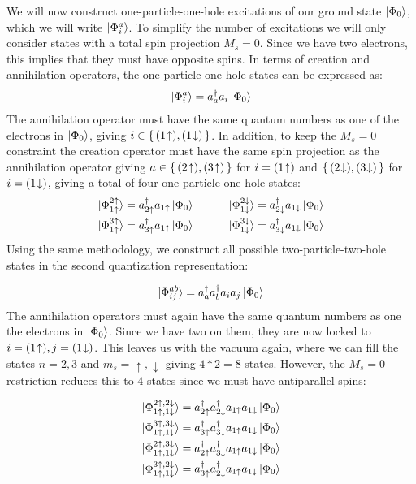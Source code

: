 \documentclass{article}
\newcommand{\gs}{\ket{\Phi_0}}
\newcommand{\exed}[2]{\ket{\Phi_{#1}^{#2}}}
\newcommand{\ups}[1]{#1\uparrow}
\newcommand{\downs}[1]{#1\downarrow}
\newcommand{\upst}[1]{#1\hspace{-2px}\uparrow}
\newcommand{\downst}[1]{#1\hspace{-2px}\downarrow}
\newcommand{\crt}[1]{a_{#1}^{\dagger}}
\newcommand{\ani}[1]{a_{#1}}
\begin{document}
    We will now construct one-particle-one-hole excitations of our ground state $\gs$, which we will write $\exed{i}{a}$. To simplify the number of excitations we will only consider states with a total spin projection $M_s = 0$. Since we have two electrons, this implies that they must have opposite spins. In terms of creation and annihilation operators, the one-particle-one-hole states can be expressed as:
    \begin{align*}
        \exed{i}{a} = \crt{a}\ani{i}\gs
    \end{align*}
    The annihilation operator must have the same quantum numbers as one of the electrons in $\gs$, giving $i \in \set{(\upst{1}),(\downst{1})}$. In addition, to keep the $M_s = 0$ constraint the creation operator must have the same spin projection as the annihilation operator giving $a \in \set{(\upst{2}),(\upst{3})}$ for $i = (\upst{1})$ and $\set{(\downst{2}),(\downst{3})}$ for $i = (\downst{1})$, giving a total of four one-particle-one-hole states:
    \begin{align*}
        \exed{\ups{1}}{\ups{2}} = \crt{\ups{2}}\ani{\ups{1}}\gs\hspace{30px}&\exed{\downs{1}}{\downs{2}} = \crt{\downs{2}}\ani{\downs{1}}\gs \\
        \exed{\ups{1}}{\ups{3}} = \crt{\ups{3}}\ani{\ups{1}}\gs\hspace{30px}&\exed{\downs{1}}{\downs{3}} = \crt{\downs{3}}\ani{\downs{1}}\gs
    \end{align*}
    Using the same methodology, we construct all possible two-particle-two-hole states in the second quantization representation:

    \begin{align*}
        \exed{ij}{ab} = \crt{a}\crt{b}\ani{i}\ani{j}\gs
    \end{align*}
    The annihilation operators must again have the same quantum numbers as one the electrons in $\gs$. Since we have two on them, they are now locked to $i = (\upst{1}), j = (\downst{1})$. This leaves us with the vacuum again, where we can fill the states $n = 2, 3$ and $m_s = \uparrow, \downarrow$ giving $4*2 = 8$ states. However, the $M_s = 0$ restriction reduces this to $4$ states since we must have antiparallel spins:
    
    \begin{align*}
        \exed{\ups{1},\downs{1}}{\ups{2},\downs{2}}=\crt{\ups{2}}\crt{\downs{2}}\ani{\ups{1}}\ani{\downs{1}}\gs \\
        \exed{\ups{1},\downs{1}}{\ups{3},\downs{3}}=\crt{\ups{3}}\crt{\downs{3}}\ani{\ups{1}}\ani{\downs{1}}\gs \\
        \exed{\ups{1},\downs{1}}{\ups{2},\downs{3}}=\crt{\ups{2}}\crt{\downs{3}}\ani{\ups{1}}\ani{\downs{1}}\gs \\
        \exed{\ups{1},\downs{1}}{\ups{3},\downs{2}}=\crt{\ups{3}}\crt{\downs{2}}\ani{\ups{1}}\ani{\downs{1}}\gs
    \end{align*}
\end{document}
